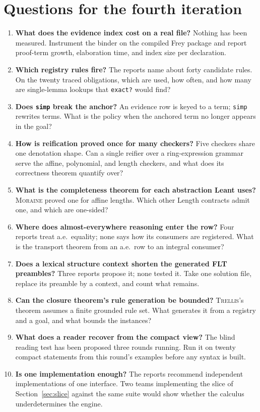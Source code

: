 \documentclass[11pt,a4paper]{article}
\newcommand{\code}[1]{\nolinkurl{#1}}
\newcommand{\Mr}{\textsc{Moraine}}
\newcommand{\Tr}{\textsc{Trellis}}
\theoremstyle{definition}
\begin{document}
\section{Questions for the fourth iteration}\label{sec:q4}
\begin{enumerate}[label=\textbf{T\arabic*.},itemsep=.5em]
\item \textbf{What does the evidence index cost on a real file?} Nothing has been measured. Instrument the binder on the compiled Frey package and report proof-term growth, elaboration time, and index size per declaration.
\item \textbf{Which registry rules fire?} The reports name about forty candidate rules. On the twenty traced obligations, which are used, how often, and how many are single-lemma lookups that \code{exact?} would find?
\item \textbf{Does \code{simp} break the anchor?} An evidence row is keyed to a term; \code{simp} rewrites terms. What is the policy when the anchored term no longer appears in the goal?
\item \textbf{How is reification proved once for many checkers?} Five checkers share one denotation shape. Can a single reifier over a ring-expression grammar serve the affine, polynomial, and length checkers, and what does its correctness theorem quantify over?
\item \textbf{What is the completeness theorem for each abstraction Leant uses?} \Mr{} proved one for affine lengths. Which other Length contracts admit one, and which are one-sided?
\item \textbf{Where does almost-everywhere reasoning enter the row?} Four reports treat a.e.\ equality; none says how its consumers are registered. What is the transport theorem from an a.e.\ row to an integral consumer?
\item \textbf{Does a lexical structure context shorten the generated FLT preambles?} Three reports propose it; none tested it. Take one solution file, replace its preamble by a context, and count what remains.
\item \textbf{Can the closure theorem's rule generation be bounded?} \Tr's theorem assumes a finite grounded rule set. What generates it from a registry and a goal, and what bounds the instances?
\item \textbf{What does a reader recover from the compact view?} The blind reading test has been proposed three rounds running. Run it on twenty compact statements from this round's examples before any syntax is built.
\item \textbf{Is one implementation enough?} The reports recommend independent implementations of one interface. Two teams implementing the slice of Section~\ref{sec:slice} against the same suite would show whether the calculus underdetermines the engine.
\end{enumerate}
\end{document}
